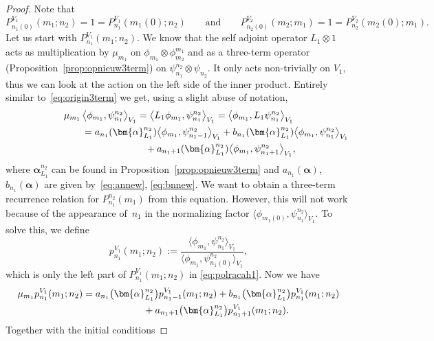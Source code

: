 \documentclass[10pt,a4paper]{amsart}
\numberwithin{equation}{section}
\newcommand{\inprod}[2]{\left\langle #1, #2 \right\rangle}
\begin{document}
\begin{proof}
	Note that
	\[
	P_{n_1(0)}^{V_1}(m_1;n_2)=1=P_{n_1}^{V_1}(m_1(0);n_2) \qquad \text{and}\qquad P_{n_2(0)}^{V_2}(m_2;m_1)=1=P_{n_2}^{V_2}(m_2(0);m_1).
	\]
	Let us start with $P_{n_1}^{V_1}(m_1;n_2)$. We know that the self adjoint operator $L_1\otimes 1$ acts as multiplication by $\mu_{m_1}$ on $\phi_{m_1}\otimes \phi_{m_2}^{m_1}$ and as a three-term operator (Proposition~\ref{prop:opnieuw3term}) on $\psi_{n_1}^{n_2}\otimes \psi_{n_2}$. It only acts non-trivially on $V_1$, thus we can look at the action on the left side of the inner product. Entirely similar to~\eqref{eq:origin3term} we get, using a slight abuse of notation,
	\begin{gather*}
		\mu_{m_1} \inprod{\phi_{m_1}}{\psi_{n_1}^{n_2}}_{V_1}= \big\langle L_1\phi_{m_1},\psi_{n_1}^{n_2}\big\rangle _{V_1}
		= \big\langle \phi_{m_1},L_1\psi_{n_1}^{n_2}\big\rangle _{V_1} \\
\hphantom{\mu_{m_1} \inprod{\phi_{m_1}}{\psi_{n_1}^{n_2}}_{V_1}}{}
= a_{n_1}(\bm{\alpha}_{L_1}^{n_2}) \big\langle \phi_{m_1},\psi_{n_1-1}^{n_2}\big\rangle _{V_1}+b_{n_1}(\bm{\alpha}_{L_1}^{n_2})\big\langle \phi_{m_1},\psi_{n_1}^{n_2}\big\rangle _{V_1}\\
\hphantom{\mu_{m_1} \inprod{\phi_{m_1}}{\psi_{n_1}^{n_2}}_{V_1}=}{}+a_{n_1+1}(\bm{\alpha}_{L_1}^{n_2})\big\langle \phi_{m_1},\psi_{n_1+1}^{n_2}\big\rangle _{V_1},
	\end{gather*}
	where $\bm{\alpha}_{L_1}^{n_2}$ can be found in Proposition~\ref{prop:opnieuw3term} and $a_{n_1}(\bm{\alpha})$, $b_{n_1}(\bm{\alpha})$ are given by~\eqref{eq:annew}, \eqref{eq:bnnew}. We want to obtain a three-term recurrence relation for $P_{n_1}^{n_2}(m_1)$ from this equation. However, this will not work because of the appearance of~$n_1$ in the normalizing factor $\big\langle \phi_{m_1(0)},\psi_{n_1}^{n_2}\big\rangle _{V_1}$. To solve this, we define
	\[
	p_{n_1}^{V_1}(m_1;n_2):=\frac{\big\langle \phi_{m_1},\psi_{n_1}^{n_2}\big\rangle _{V_1}}{\big\langle \phi_{m_1},\psi_{n_1(0)}^{n_2}\big\rangle _{V_1}},
	\]
	which is only the left part of $P_{n_1}^{V_1}(m_1;n_2)$ in \eqref{eq:polracah1}. Now we have
	\begin{gather*}
		\mu_{m_1}p_{n_1}^{V_1}(m_1;n_2)= a_{n_1}\big(\bm{\alpha}_{L_1}^{n_2}\big)p_{n_1-1}^{V_1}(m_1;n_2) + b_{n_1}\big(\bm{\alpha}_{L_1}^{n_2}\big)p_{n_1}^{V_1}(m_1;n_2)\\
\hphantom{\mu_{m_1}p_{n_1}^{V_1}(m_1;n_2)=}{}
+ a_{n_1+1}\big(\bm{\alpha}_{L_1}^{n_2}\big)p_{n_1+1}^{V_1}(m_1;n_2).
	\end{gather*}
	Together with the initial conditions

\end{proof}
\end{document}
